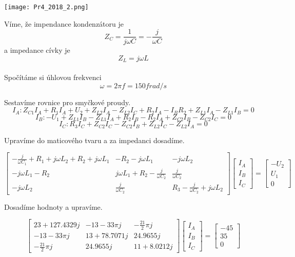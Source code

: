 \documentclass[11pt]{article}
\begin{document}
\begin{center}
	\texttt{[image: Pr4\_2018\_2.png]} 
\end{center}

Víme, že impendance kondenzátoru je \[Z_C = \frac{1}{j{\omega}C} = -\frac{j}{{\omega}C}\]
a impedance cívky je \[Z_L = j{\omega}L \]
\\
Spočítáme si úhlovou frekvenci \[\omega = 2{\pi}f=150f rad/s\]

Sestavíme rovnice pro smyčkové proudy.
\[I_A: Z_{C1}I_A + R_1I_A + U_2 + Z_{L2}I_A - Z_{L2}I_C + R_2I_A - I_BR_2 + Z_{L1}I_A - Z_{L1}I_B = 0\]
\[I_B: -U_1 + Z_{L1}I_B - Z_{L1}I_A + R_2I_B - R_2I_A + Z_{C2}I_B - Z_{C2}I_C = 0\]
\[I_C: R_3I_C + Z_{C2}I_C - Z_{C2}I_B + Z_{L2}I_C - Z_{L2}I_A = 0\]

Upravíme do maticového tvaru a za impedanci dosadíme.

\[
\begin{bmatrix}
-\frac{j}{{\omega}C_1} + R_1 + j{\omega}L_2 + R_2 + j{\omega}L_1 & -R_2 - j{\omega}L_1 & -j{\omega}L_2 \\
-j{\omega}L_1 - R_2 & j{\omega}L_1 + R_2 - \frac{j}{{\omega}C_2} & \frac{j}{{\omega}C_2} \\
-j{\omega}L_2 & \frac{j}{{\omega}C_2} & R_3 - \frac{j}{{\omega}C_2} + j{\omega}L_2
\end{bmatrix}
\begin{bmatrix}
I_A \\
I_B \\
I_C
\end{bmatrix}
=
\begin{bmatrix}
-U_2 \\
U_1 \\
0
\end{bmatrix}
\]

Dosadíme hodnoty a upravíme.

\[
\begin{bmatrix}
23 + 127.4329j & -13 - 33{\pi}j & -\frac{21}{2}{\pi}j \\
-13 - 33{\pi}j & 13 + 78.7071j & 24.9655j \\
-\frac{21}{2}{\pi}j & 24.9655j & 11 + 8.0212j
\end{bmatrix}
\begin{bmatrix}
I_A \\
I_B \\
I_C
\end{bmatrix}
=
\begin{bmatrix}
-45 \\
35 \\
0
\end{bmatrix}
\]
\end{document}

